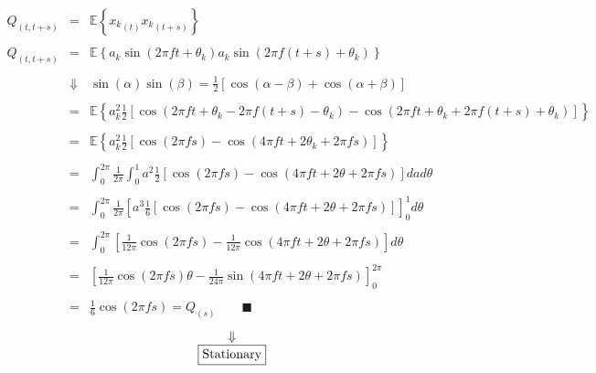 \documentclass[11pt, a4paper]{article}
\begin{document}
\begin{equation}
    \begin{array}{rcl}
        Q_{\left(t,t+s\right)} & = & \displaystyle \mathbb{E}\left\{{x_k}_{\left(t\right)}{x_k}_{\left(t+s\right)}\right\} \\\\
        Q_{\left(t,t+s\right)} & = & \displaystyle \mathbb{E}\left\{a_k\sin{\left(2\pi ft+\theta_k\right)}a_k\sin{\left(2\pi f\left(t+s\right)+\theta_k\right)}\right\} \\\\
        & \Downarrow & \displaystyle \sin{\left(\alpha\right)}\sin{\left(\beta\right)}=\frac{1}{2}\left[\cos\left(\alpha-\beta\right)+\cos\left(\alpha+\beta\right)\right] \\\\
        & = & \displaystyle \mathbb{E}\left\{a_k^2\frac{1}{2}\left[\cos\left(2\pi ft+\theta_k-2\pi f\left(t+s\right)-\theta_k\right)-\cos\left(2\pi ft+\theta_k+2\pi f\left(t+s\right)+\theta_k\right)\right]\right\} \\\\
        & = & \displaystyle \mathbb{E}\left\{a_k^2\frac{1}{2}\left[\cos\left(2\pi fs\right)-\cos\left(4\pi ft+2\theta_k+2\pi fs\right)\right]\right\} \\\\
        & = & \displaystyle \int_{0}^{2\pi}{\frac{1}{2\pi}\int_{0}^{1}{a^2\frac{1}{2}\left[\cos\left(2\pi fs\right)-\cos\left(4\pi ft+2\theta+2\pi fs\right)\right]da}d\theta} \\\\
        & = & \displaystyle \int_{0}^{2\pi}{\frac{1}{2\pi}\left[a^3\frac{1}{6}\left[\cos\left(2\pi fs\right)-\cos\left(4\pi ft+2\theta+2\pi fs\right)\right]\right]_0^1d\theta} \\\\
        & = & \displaystyle \int_{0}^{2\pi}{\left[\frac{1}{12\pi}\cos\left(2\pi fs\right)-\frac{1}{12\pi}\cos\left(4\pi ft+2\theta+2\pi fs\right)\right]d\theta} \\\\
        & = & \displaystyle \left[\frac{1}{12\pi}\cos\left(2\pi fs\right)\theta-\frac{1}{24\pi}\sin\left(4\pi ft+2\theta+2\pi fs\right)\right]_0^{2\pi} \\\\
        & = & \displaystyle \frac{1}{6}\cos\left(2\pi fs\right)=Q_{\left(s\right)}\qquad\blacksquare
    \end{array}
\end{equation}
\begin{equation*}
    \begin{array}{c}
        \Downarrow \\
        \boxed{$\text{Stationary}$}
    \end{array}
\end{equation*}
\end{document}
